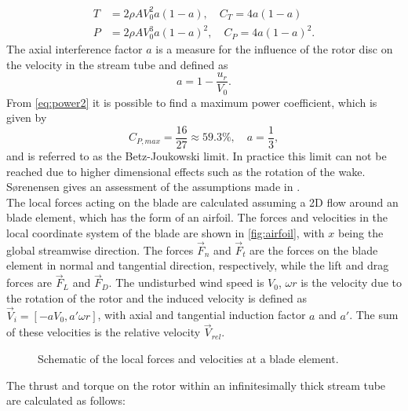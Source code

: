 \begin{align}
	T &= 2 \rho A V_0^2 a(1-a), \quad C_T = 4a(1-a) \label{eq:thrust2}\\
	P &= 2 \rho A V_0^3 a(1-a)^2, \quad C_P = 4a(1-a)^2 \label{eq:power2}.
\end{align}
The axial interference factor $a$ is a measure for the influence of the rotor disc on the velocity in the stream tube and defined as
\begin{equation}
	a = 1 - \frac{u_r}{V_0}.
\end{equation}
From \eqref{eq:power2} it is possible to find a maximum power coefficient, which is given by
\begin{equation}
		C_{P,max} = \frac{16}{27} \approx 59.3 \%, \quad a = \frac{1}{3} \label{eq:betz-limit},
\end{equation}
and is referred to as the Betz-Joukowski limit. In practice this limit can not be reached due to higher dimensional effects such as the rotation of the wake. Sørenensen gives an assessment of the assumptions made in \cite{sorensen_general_2016}. \cite[p. 7 - 11]{sorensen_general_2016} \\
The local forces acting on the blade are calculated assuming a 2D flow around an blade element, which has the form of an airfoil. The forces and velocities in the local coordinate system of the blade are shown in \autoref{fig:airfoil}, with $x$ being the global streamwise direction. The forces $\vec{F}_n$ and $\vec{F}_t$ are the forces on the blade element in normal and tangential direction, respectively, while the lift and drag forces are $\vec{F}_L$ and $\vec{F}_D$. The undisturbed wind speed is $V_0$, $\omega r$ is the velocity due to the rotation of the rotor and the induced velocity is defined as $\vec{V}_i = [-a V_0, a'\omega r]$, with axial and tangential induction factor $a$ and $a'$. The sum of these velocities is the relative velocity $\vec{V}_{rel}$.
\begin{figure}[H]
	\centering
	\def\svgwidth{0.5 \textwidth}
	
	\caption{Schematic of the local forces and velocities at a blade element.}
	\label{fig:airfoil}
\end{figure}
The thrust and torque on the rotor within an infinitesimally thick stream tube are calculated as follows:
